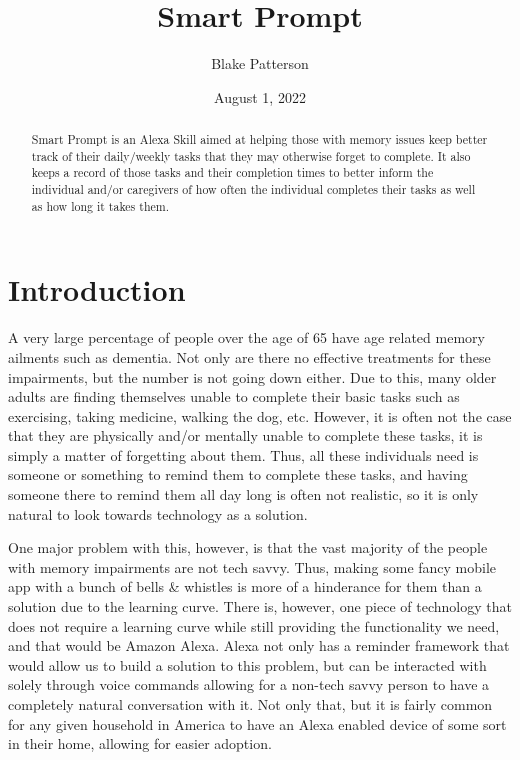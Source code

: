 \documentclass[11pt, oneside]{article}
\begin{document}
\title{Smart Prompt}
\author{Blake Patterson}
\date{August 1, 2022}
\maketitle

\begin{abstract}
Smart Prompt is an Alexa Skill aimed at helping those with memory issues keep better track of their daily/weekly tasks that they may otherwise forget to complete. 
It also keeps a record of those tasks and their completion times to better inform the individual and/or caregivers of how often the individual completes their tasks as well as how long it takes them. 
\end{abstract}

\newpage
\tableofcontents
\newpage
{}


\section{Introduction}

A very large percentage of people over the age of 65 have age related memory ailments such as dementia.
Not only are there no effective treatments for these impairments, but the number is not going down either. 
Due to this, many older adults are finding themselves unable to complete their basic tasks such as exercising, taking medicine, walking the dog, etc.
However, it is often not the case that they are physically and/or mentally unable to complete these tasks, it is simply a matter of forgetting about them. 
Thus, all these individuals need is someone or something to remind them to complete these tasks, and having someone there to remind them all day long is often not realistic, so it is only natural to look towards technology as a solution. 

One major problem with this, however, is that the vast majority of the people with memory impairments are not tech savvy. 
Thus, making some fancy mobile app with a bunch of bells \& whistles is more of a hinderance for them than a solution due to the learning curve. 
There is, however, one piece of technology that does not require a learning curve while still providing the functionality we need, and that would be Amazon Alexa. 
Alexa not only has a reminder framework that would allow us to build a solution to this problem, but can be interacted with solely through voice commands allowing for a non-tech savvy person to have a completely natural conversation with it. 
Not only that, but it is fairly common for any given household in America to have an Alexa enabled device of some sort in their home, allowing for easier adoption. 
\end{document}
